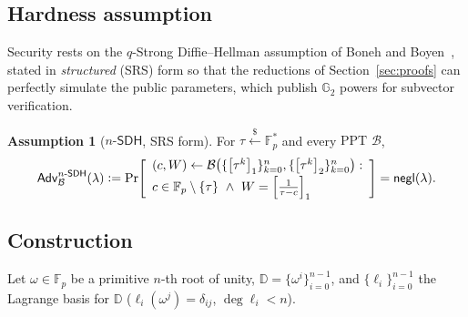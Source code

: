 \documentclass[version=preprint]{iacrcc}
\theoremstyle{definition}
\newtheorem{assumption}{Assumption}[section]
\newcommand{\secpar}{\lambda}
\newcommand{\negl}{\mathsf{negl}}
\newcommand{\PPT}{\mathrm{PPT}}
\newcommand{\sample}{\xleftarrow{\;\$\;}}
\newcommand{\defeq}{\vcentcolon=}
\newcommand{\Adv}{\mathsf{Adv}}
\newcommand{\B}{\mathcal{B}}
\newcommand{\GG}{\mathbb{G}}
\newcommand{\FF}{\mathbb{F}}
\newcommand{\gone}[1]{\left[#1\right]_{1}}
\newcommand{\gtwo}[1]{\left[#1\right]_{2}}
\newcommand{\dom}{\mathbb{D}}
\newcommand{\lag}{\ell}
\newcommand{\nsdh}{n\text{-}\mathsf{SDH}}
\begin{document}
\subsection{Hardness assumption}

Security rests on the $q$-Strong Diffie--Hellman assumption of Boneh and Boyen~\cite{EC:BonBoy04a}, stated in
\emph{structured} (SRS) form so that the reductions of
Section~\ref{sec:proofs} can perfectly simulate the public parameters, which
publish $\GG_2$ powers for subvector verification.

\begin{assumption}[$\nsdh$, SRS form]\label{ass:nsdh}
For $\tau\sample\FF_p^{*}$ and every $\PPT$ $\B$,
\[
  \Adv^{\nsdh}_{\B}(\secpar)\defeq
  \Pr\!\left[
  \begin{array}{l}
    (c,W)\leftarrow\B\big(\{\gone{\tau^{k}}\}_{k=0}^{n},
                          \{\gtwo{\tau^{k}}\}_{k=0}^{n}\big):\\[2pt]
    c\in\FF_p\setminus\{\tau\}\ \wedge\ W=\gone{\tfrac{1}{\tau-c}}
  \end{array}
  \right]=\negl(\secpar).
\]
\end{assumption}

\subsection{Construction}

Let $\omega\in\FF_p$ be a primitive $n$-th root of unity,
$\dom=\{\omega^{i}\}_{i=0}^{n-1}$, and $\{\lag_i\}_{i=0}^{n-1}$ the Lagrange basis
for $\dom$ ($\lag_i(\omega^{j})=\delta_{ij}$, $\deg\lag_i<n$).
\end{document}
